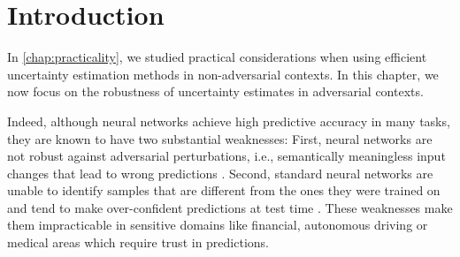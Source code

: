 \section{Introduction}
\label{sec:introduction_008}

In \cref{chap:practicality}, we studied practical considerations when using efficient uncertainty estimation methods in non-adversarial contexts. In this chapter, we now focus on the robustness of uncertainty estimates in adversarial contexts.

Indeed, although neural networks achieve high predictive accuracy in many tasks, they are known to have two substantial weaknesses: First, neural networks are not robust against adversarial perturbations, i.e., semantically meaningless input changes that lead to wrong predictions \citep{szegedy2014, goodfellow2014}. 
Second, standard neural networks are unable to identify samples that are different from the ones they were trained on and tend to make over-confident predictions at test time \citep{ensembles}. These weaknesses make them impracticable in sensitive domains like financial, autonomous driving or medical areas which require trust in predictions.

